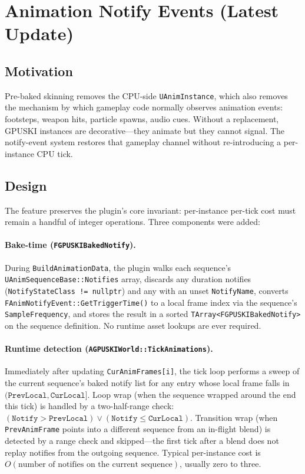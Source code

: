 \documentclass[11pt, a4paper]{article}
\begin{document}
\section{Animation Notify Events (Latest Update)}

\subsection{Motivation}

Pre-baked skinning removes the CPU-side \texttt{UAnimInstance}, which also removes the mechanism by which gameplay code normally observes animation events: footsteps, weapon hits, particle spawns, audio cues. Without a replacement, GPUSKI instances are decorative---they animate but they cannot signal. The notify-event system restores that gameplay channel without re-introducing a per-instance CPU tick.

\subsection{Design}

The feature preserves the plugin's core invariant: per-instance per-tick cost must remain a handful of integer operations. Three components were added:

\paragraph{Bake-time (\texttt{FGPUSKIBakedNotify}).}
During \texttt{BuildAnimationData}, the plugin walks each sequence's \texttt{UAnimSequenceBase::Notifies} array, discards any duration notifies (\texttt{NotifyStateClass != nullptr}) and any with an unset \texttt{NotifyName}, converts \texttt{FAnimNotifyEvent::GetTriggerTime()} to a local frame index via the sequence's \texttt{SampleFrequency}, and stores the result in a sorted \texttt{TArray<FGPUSKIBakedNotify>} on the sequence definition. No runtime asset lookups are ever required.

\paragraph{Runtime detection (\texttt{AGPUSKIWorld::TickAnimations}).}
Immediately after updating \texttt{CurAnimFrames[i]}, the tick loop performs a sweep of the current sequence's baked notify list for any entry whose local frame falls in $(\texttt{PrevLocal}, \texttt{CurLocal}]$. Loop wrap (when the sequence wrapped around the end this tick) is handled by a two-half-range check: $(\texttt{Notify} > \texttt{PrevLocal}) \lor (\texttt{Notify} \leq \texttt{CurLocal})$. Transition wrap (when \texttt{PrevAnimFrame} points into a different sequence from an in-flight blend) is detected by a range check and skipped---the first tick after a blend does not replay notifies from the outgoing sequence. Typical per-instance cost is $O(\text{number of notifies on the current sequence})$, usually zero to three.
\end{document}
